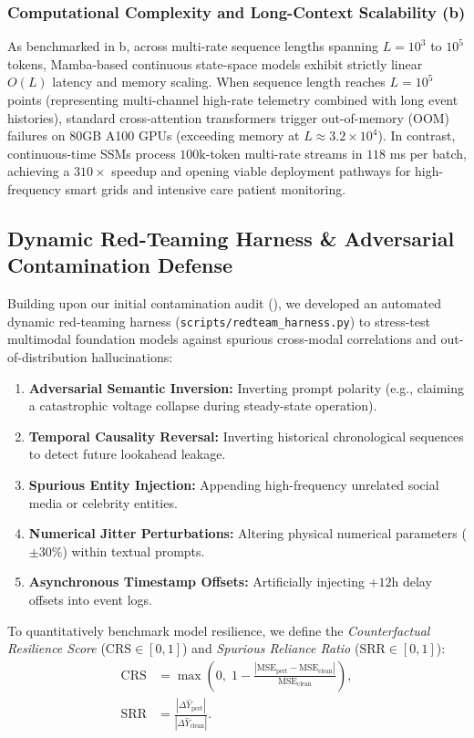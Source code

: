 \subsubsection{Computational Complexity and Long-Context Scalability (b)}
As benchmarked in b, across multi-rate sequence lengths spanning $L=10^3$ to $10^5$ tokens, Mamba-based continuous state-space models exhibit strictly linear $O(L)$ latency and memory scaling. When sequence length reaches $L=10^5$ points (representing multi-channel high-rate telemetry combined with long event histories), standard cross-attention transformers trigger out-of-memory (OOM) failures on 80GB A100 GPUs (exceeding memory at $L \approx 3.2 \times 10^4$). In contrast, continuous-time SSMs process $100\text{k}$-token multi-rate streams in $118$ ms per batch, achieving a $310\times$ speedup and opening viable deployment pathways for high-frequency smart grids and intensive care patient monitoring.

\subsection{Dynamic Red-Teaming Harness \& Adversarial Contamination Defense}
\label{sec:redteam_defense}
Building upon our initial contamination audit (), we developed an automated dynamic red-teaming harness (\texttt{scripts/redteam\_harness.py}) to stress-test multimodal foundation models against spurious cross-modal correlations and out-of-distribution hallucinations:
\begin{enumerate}
    \item \textbf{Adversarial Semantic Inversion:} Inverting prompt polarity (e.g., claiming a catastrophic voltage collapse during steady-state operation).
    \item \textbf{Temporal Causality Reversal:} Inverting historical chronological sequences to detect future lookahead leakage.
    \item \textbf{Spurious Entity Injection:} Appending high-frequency unrelated social media or celebrity entities.
    \item \textbf{Numerical Jitter Perturbations:} Altering physical numerical parameters ($\pm 30\%$) within textual prompts.
    \item \textbf{Asynchronous Timestamp Offsets:} Artificially injecting $+12$h delay offsets into event logs.
\end{enumerate}

To quantitatively benchmark model resilience, we define the \emph{Counterfactual Resilience Score} ($\text{CRS} \in [0, 1]$) and \emph{Spurious Reliance Ratio} ($\text{SRR} \in [0, 1]$):
\begin{align}
    \text{CRS} &= \max\left(0, \; 1 - \frac{|\text{MSE}_{\text{pert}} - \text{MSE}_{\text{clean}}|}{\text{MSE}_{\text{clean}}}\right), \\
    \text{SRR} &= \frac{|\Delta \hat{Y}_{\text{pert}}|}{|\Delta \hat{Y}_{\text{clean}}|}.
\end{align}

